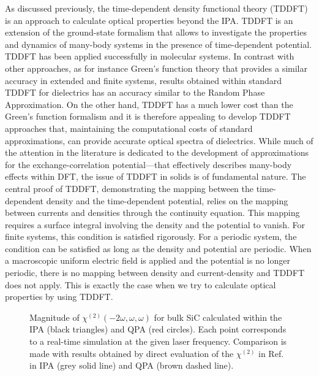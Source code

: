 As discussed previously, the time-dependent density functional theory (TDDFT)  is an approach to calculate optical properties beyond the IPA.
TDDFT is an extension of the ground-state formalism that allows to investigate the properties and dynamics of many-body systems in the presence of time-dependent potential.\cite{PhysRevLett.52.997} 
TDDFT has been applied successfully in molecular systems. In contrast with other approaches, as for instance Green's function theory\cite{strinati} that provides a similar accuracy in extended\cite{Aulbur19991} and finite systems\cite{li2019comparing}, results obtained within standard TDDFT for dielectrics has an accuracy similar to the Random Phase Approximation.
On the other hand, TDDFT has a much lower cost than the Green's function formalism and it is therefore appealing to develop TDDFT approaches that, maintaining the computational costs of standard approximations, can provide accurate optical spectra of dielectrics.   
While much of the attention in the literature is dedicated to the development of approximations for the exchange-correlation potential---that effectively describes many-body effects within DFT, the issue of TDDFT in solids is of fundamental nature. The central proof of TDDFT, demonstrating the mapping between the time-dependent density and the time-dependent potential, relies on the mapping between currents and densities through the continuity equation. This mapping requires a surface integral involving the density and the potential to vanish. For finite systems, this condition is satisfied rigorously. For a periodic system, the condition can be satisfied as long as the density and potential are periodic. When a macroscopic uniform electric field is applied and the potential is no longer periodic, there is no mapping between density and current-density and TDDFT does not apply.\cite{Gonze1995} This is exactly the case when we try to calculate optical properties by using TDDFT. 

\begin{figure}
\centering
{}
\caption{\footnotesize{Magnitude of $\chi^{(2)}(-2\omega,\omega,\omega)$ for bulk SiC calculated within the IPA (black triangles) and QPA (red circles). Each point corresponds to a real-time simulation at the given laser frequency. Comparison is made with results obtained \ai by direct evaluation of the $\chi^{(2)}$ in Ref.~\cite{PhysRevB.82.235201} in IPA (grey solid line) and QPA (brown dashed line).  \label{fg:SiCQPRPA} }}
\end{figure}


